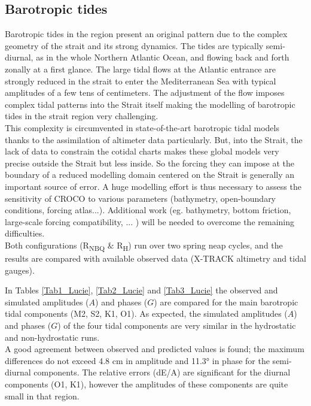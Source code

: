\vspace{\baselineskip}
\subsection{Barotropic tides}

\vspace{\baselineskip}
Barotropic tides in the region present an original pattern due to the complex geometry of the strait and its strong dynamics. The tides are typically semi-diurnal, as in the whole Northern Atlantic Ocean, and flowing back and forth zonally at a first glance. The large tidal flows at the Atlantic entrance are strongly reduced in the strait to enter the Mediterranean Sea with typical amplitudes of a few tens of centimeters. The adjustment of the flow imposes complex tidal patterns into the Strait itself making the modelling of barotropic tides in the strait region very challenging. \\
This complexity is circumvented in state-of-the-art barotropic tidal models thanks to the assimilation of altimeter data particularly. But, into the Strait, the lack of data to constrain the cotidal charts makes these global models very precise outside the Strait but less inside. So the forcing they can impose at the boundary of a reduced modelling domain centered on the Strait is generally an important source of error. A huge modelling effort is thus necessary to assess the sensitivity of CROCO to various parameters (bathymetry, open-boundary conditions, forcing atlas...). Additional work (eg. bathymetry, bottom friction, large-scale forcing compatibility, ... ) will be needed to overcome the remaining difficulties.\\
Both configurations (R\textsubscript{NBQ} $\&$  R\textsubscript{H}) run over two spring neap cycles, and the results are compared with available observed data (X-TRACK altimetry and tidal gauges). \par
In Tables \ref{Tab1_Lucie}, \ref{Tab2_Lucie} and \ref{Tab3_Lucie} the observed and simulated amplitudes ($A$) and phases ($G$) are compared for the
main barotropic tidal components (M2, S2, K1, O1). As expected, the simulated amplitudes ($A$) and phases ($G$) of the four tidal components are very similar in the hydrostatic and non-hydrostatic runs.\\

A good agreement between observed and predicted values is found; the maximum differences do not exceed 4.8 cm in amplitude and 11.3° in phase for the semi-diurnal components. The relative errors (dE/A) are significant for the diurnal components (O1, K1), however the amplitudes of these components are quite small in that region.


